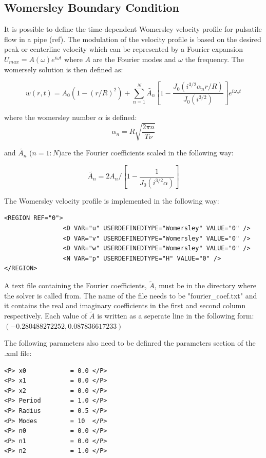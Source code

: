 \subsection{Womersley Boundary Condition}

It is possible to define the time-dependent Womersley velocity profile for pulsatile flow in a pipe (ref). The modulation of the velocity profile is based on the desired peak or centerline velocity which can be represented by a Fourier expansion $U_{max}=A(\omega)e^{i\omega t}$ where $A$ are the Fourier modes and $\omega $ the frequency. The womersely solution is then defined as:

$$ w(r,t) = A_0(1-(r/R)^2) + \sum_{n=1}^N \tilde{A_n}[1-\frac{J_0(i^{3/2}\alpha_n r/R)}{J_0(i^{3/2})}]e^{i\omega_n t} $$

where the womersley number $\alpha$ is defined:
$$ \alpha_n = R\sqrt{\frac{2\pi n}{T\nu}}$$

and $\tilde{A_n}$ ($n=1:N$)are the Fourier coefficients scaled in the following way:

$$ \tilde{A_n} = 2A_n/[1 - \frac{1}{J_0(i^{3/2}\alpha)}] $$

The Womersley velocity profile is implemented in the following way:

\begin{lstlisting}[style=XMLStyle]
<REGION REF="0">
                <D VAR="u" USERDEFINEDTYPE="Womersley" VALUE="0" />
                <D VAR="v" USERDEFINEDTYPE="Womersley" VALUE="0" />
                <D VAR="w" USERDEFINEDTYPE="Womersley" VALUE="0" />
                <N VAR="p" USERDEFINEDTYPE="H" VALUE="0" />
</REGION>
\end{lstlisting}

A text file containing the Fourier coefficients, $\tilde{A}$, must be in the directory where the solver is called from. The name of the file needs to be "fourier\_coef.txt" and it contains the real and imaginary coefficients in the first and second column respectively. Each value of $\tilde{A}$ is written as a seperate line in the following form:
$(-0.280488272252,0.087836617233)$

The following parameters also need to be definred the parameters section of the .xml file:

\begin{lstlisting}[style=XMLStyle]
<P> x0            = 0.0 </P>
<P> x1            = 0.0 </P>
<P> x2            = 0.0 </P>
<P> Period        = 1.0 </P>
<P> Radius        = 0.5 </P>
<P> Modes         = 10  </P>
<P> n0            = 0.0 </P>
<P> n1            = 0.0 </P>
<P> n2            = 1.0 </P>
\end{lstlisting}

